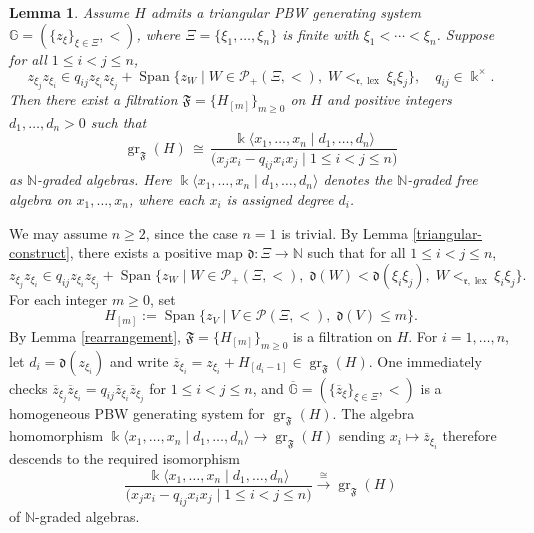 \documentclass{article}
\makeatletter
\renewenvironment{proof}[1][\proofname]{\par
	\pushQED{\qed}%
	\normalfont \topsep6\p@\@plus6\p@\relax
	\trivlist
	\item[\hskip\labelsep
	\bfseries
	#1\@addpunct{.}]\ignorespaces
}{%
	\popQED\endtrivlist\@endpefalse
}
\theoremstyle{plain}
\newtheorem{lemma}[thm]{Lemma}
\theoremstyle{definition}
\numberwithin{equation}{section}
\DeclareMathOperator{\gr}{gr}
\DeclareMathOperator{\Span}{Span}
\DeclareMathOperator{\lex}{lex}
\newcommand{\PP}{\mathcal{P}}
\newcommand{\GG}{\mathbb{G}}
\newcommand{\dd}{\mathfrak{d}}
\newcommand{\rr}{\mathfrak{r}}
\makeatother
\begin{document}
	\begin{lemma}\label{filtration-PBW}
		Assume $H$ admits a triangular PBW generating system $\GG=(\{z_{\xi}\}_{\xi\in \Xi}, <)$, where $\Xi = \{\xi_{1},\ldots, \xi_{n}\}$ is finite with $\xi_{1}<\cdots< \xi_{n}$. Suppose for all $1\leq i<j\leq n$,
		\[
		z_{\xi_{j}} z_{\xi_{i}} \in q_{ij} z_{\xi_{i}} z_{\xi_{j}}+ \Span\{z_{W} \mid W \in \PP_{+}(\Xi, <),\; W<_{\rr,\lex} \xi_{i}\xi_{j}\},\quad  q_{ij}\in \Bbbk^{\times}.
		\]
		Then there exist a filtration $\mathfrak{F}=\{H_{[m]}\}_{m\geq 0 }$ on $H$ and positive integers $d_{1},\ldots, d_{n}>0$ such that
		\[
		\gr_{\mathfrak{F}}(H) \,\cong\, \frac{\Bbbk\langle x_{1},\dots, x_{n} \mid d_{1},\dots, d_{n} \rangle}{\big(x_{j}x_{i} -q_{ij}x_{i}x_{j} \mid 1\leq i< j\leq n\big)}
		\]
		as $\mathbb{N}$-graded algebras. Here $\Bbbk\langle x_{1},\dots, x_{n} \mid d_{1},\dots, d_{n} \rangle$ denotes the $\mathbb{N}$-graded free algebra on $x_{1},\dots, x_{n}$, where each $x_i$ is assigned degree $d_i$.
	\end{lemma}
	
	\begin{proof}
		We may assume $n\geq 2$, since the case $n=1$ is trivial. By Lemma \ref{triangular-construct}, there exists a positive map $\dd\colon\Xi\to \mathbb{N}$ such that for all $1\leq i<j\leq n$,
		\[
		z_{\xi_{j}} z_{\xi_{i}} \in q_{ij} z_{\xi_{i}} z_{\xi_{j}} + \Span\{z_{W} \mid W \in \PP_{+}(\Xi, <),\; \dd(W) < \dd(\xi_{i}\xi_{j}),\; W<_{\rr,\lex} \xi_{i}\xi_{j} \}.
		\]
		For each integer $m\geq 0$, set
		\[
		H_{[m]} := \Span\{z_{V}\mid V\in \PP(\Xi, <),\; \dd(V) \leq m\}.
		\]
		By Lemma \ref{rearrangement}, $\mathfrak{F}=\{H_{[m]}\}_{m\geq 0 }$ is a filtration on $H$. For $i=1,\ldots, n$, let $d_{i} =\dd(z_{\xi_{i}})$ and write $\overline{z}_{\xi_{i}} = z_{\xi_{i}} + H_{[d_{i}-1]} \in \gr_{\mathfrak{F}}(H)$. One immediately checks $\overline{z}_{\xi_{j}} \overline{z}_{\xi_{i}} = q_{ij} \overline{z}_{\xi_{i}} \overline{z}_{\xi_{j}}$ for $1\leq i<j\leq n$, and $\overline{\GG}= (\{\overline{z}_{\xi}\}_{\xi\in \Xi}, <)$ is a homogeneous PBW generating system for $\gr_{\mathfrak{F}}(H)$. The algebra homomorphism $\Bbbk\langle x_{1},\ldots, x_{n} \mid d_{1},\ldots, d_{n} \rangle \to \gr_{\mathfrak{F}}(H)$ sending $x_{i} \mapsto \overline{z}_{\xi_{i}}$ therefore descends to the required isomorphism
		\[
		\frac{\Bbbk\langle x_{1},\dots, x_{n} \mid d_{1},\dots, d_{n} \rangle}{\big(x_{j}x_{i} -q_{ij}x_{i}x_{j} \mid 1\leq i< j\leq n\big)} \xrightarrow{\cong} \gr_{\mathfrak{F}}(H)
		\]
		of $\mathbb{N}$-graded algebras.
	\end{proof}
	
\end{document}
